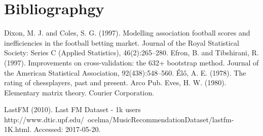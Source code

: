 
\chapter{Bibliographgy} %

\label{Chapter3} %


Dixon, M. J. and Coles, S. G. (1997). Modelling association football scores and inefficiencies in the
football betting market. Journal of the Royal Statistical Society: Series C (Applied Statistics),
46(2):265–280.
Efron, B. and Tibshirani, R. (1997). Improvements on cross-validation: the 632+ bootstrap method.
Journal of the American Statistical Association, 92(438):548–560.
Élő, A. E. (1978). The rating of chessplayers, past and present. Arco Pub.
Eves, H. W. (1980). Elementary matrix theory. Courier Corporation.

LastFM (2010). Last FM Dataset - 1k users http://www.dtic.upf.edu/~ocelma/MusicRecommendationDataset/lastfm-1K.html. Accessed: 2017-05-20.